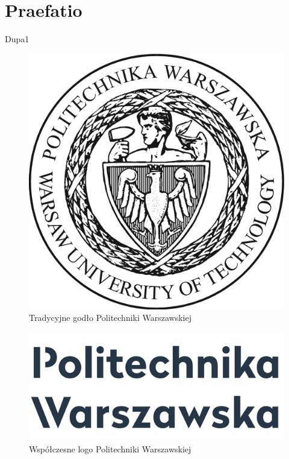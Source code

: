 \documentclass[
    left=2.5cm,         %
    right=2.5cm,        %
    top=2.5cm,          %
    bottom=3cm,         %
    bindingoffset=6mm,  %
    nohyphenation=false %
]{eiti/eiti-thesis}
\begin{document}
\newpage %
\section{Praefatio}
Dupa1
\begin{figure}[!h]
    \label{fig:tradycyjne-logo-pw}
    \centering \includegraphics[width=0.5\linewidth]{logopw.png}
    \caption{Tradycyjne godło Politechniki Warszawskiej}
\end{figure}
\lipsum[2-3]
\begin{figure}[!h]
	\label{fig:nowe-logo-pw}
	\centering \includegraphics[width=0.5\linewidth]{logopw2.png}
	\caption{Współczesne logo Politechniki Warszawskiej}
\end{figure}
\lipsum[4-6]
\end{document}

